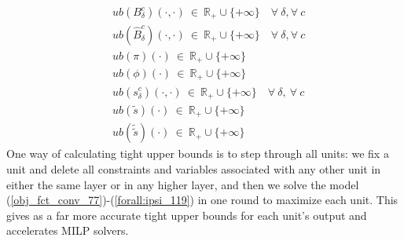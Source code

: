 \documentclass{article}
\begin{document}
{\begin{align}
&ub(B_\delta^c)(\cdot, \cdot) \ \in \ \mathbb{R}_+ \cup \{+\infty\} \quad \forall \ \delta, \forall \ c \\
&ub(\hat{B}_\delta^c)(\cdot, \cdot) \ \in \ \mathbb{R}_+ \cup \{+\infty\} \quad \forall \ \delta, \forall \ c \\ 
&ub(\pi)(\cdot) \ \in \ \mathbb{R}_+ \cup \{+\infty\} \\
&ub(\phi)(\cdot) \ \in \ \mathbb{R}_+ \cup \{+\infty\} \\
&ub(s_\delta^c)(\cdot, \cdot) \ \in \ \mathbb{R}_+ \cup \{+\infty\} \quad \forall \ \delta, \ \forall \ c \\
&ub(\tilde{s})(\cdot) \ \in \ \mathbb{R}_+ \cup \{+\infty\} \\
&ub(\tilde{\tilde{s}})(\cdot) \ \in \ \mathbb{R}_+ \cup \{+\infty\}
\end{align}
One way of calculating tight upper bounds is to step through all units: we fix a unit and delete all constraints and variables associated with any other unit in either the same layer or in any higher layer, and then we solve the model (\ref{obj_fct_conv_77})-(\ref{forall:ipsi_119}) in one round to maximize each unit. This gives as a far more accurate tight upper bounds for each unit's output and accelerates MILP solvers.

}
\end{document}
